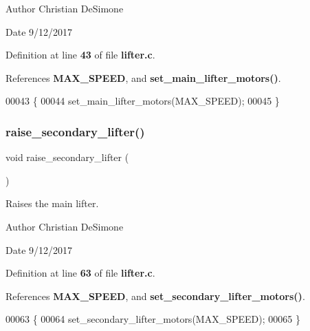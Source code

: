 \begin{DoxyAuthor}{Author}
Christian De\+Simone 
\end{DoxyAuthor}
\begin{DoxyDate}{Date}
9/12/2017 
\end{DoxyDate}


Definition at line \textbf{ 43} of file \textbf{ lifter.\+c}.



References \textbf{ M\+A\+X\+\_\+\+S\+P\+E\+ED}, and \textbf{ set\+\_\+main\+\_\+lifter\+\_\+motors()}.


\begin{DoxyCode}
00043                         \{
00044   set_main_lifter_motors(MAX_SPEED);
00045 \}
\end{DoxyCode}
\mbox{\label{lifter_8c_a786f679ea48bb8c80e00fbac9a69911b}} 
\subsubsection{raise\+\_\+secondary\+\_\+lifter()}
{\footnotesize\ttfamily void raise\+\_\+secondary\+\_\+lifter (\begin{DoxyParamCaption}{ }\end{DoxyParamCaption})}



Raises the main lifter. 

\begin{DoxyAuthor}{Author}
Christian De\+Simone 
\end{DoxyAuthor}
\begin{DoxyDate}{Date}
9/12/2017 
\end{DoxyDate}


Definition at line \textbf{ 63} of file \textbf{ lifter.\+c}.



References \textbf{ M\+A\+X\+\_\+\+S\+P\+E\+ED}, and \textbf{ set\+\_\+secondary\+\_\+lifter\+\_\+motors()}.


\begin{DoxyCode}
00063                              \{
00064   set_secondary_lifter_motors(MAX_SPEED);
00065 \}
\end{DoxyCode}
\mbox{\label{lifter_8c_abddc7cb502e12fa277b627c90a45efb1}} 
